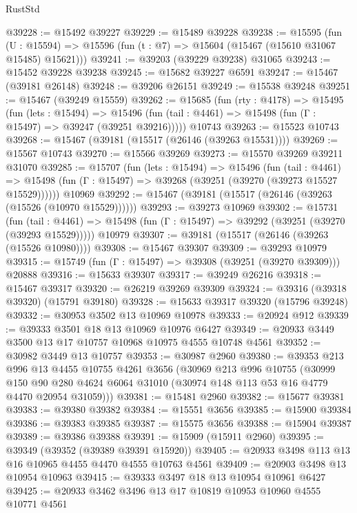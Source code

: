 \begin{lexlean}{RustStd}
\begin{coremodule}
@39228 := @15492 @39227
@39229 := @15489 @39228
@39238 := @15595
    (fun (U : @15594) => @15596 (fun (t : @7) => @15604 (@15467 (@15610 @31067 @15485) @15621)))
@39241 := @39203 (@39229 @39238) @31065
@39243 := @15452 @39228 @39238
@39245 := @15682 @39227 @6591
@39247 := @15467 (@39181 @26148)
@39248 := @39206 @26151
@39249 := @15538 @39248
@39251 := @15467 (@39249 @15559)
@39262 := @15685
    (fun (rty : @4178) =>
    @15495
      (fun (lets : @15494) =>
      @15496 (fun (tail : @4461) => @15498 (fun (Γ : @15497) => @39247 (@39251 @39216)))))
    @10743
@39263 := @15523 @10743
@39268 := @15467 (@39181 (@15517 (@26146 (@39263 @15531))))
@39269 := @15567 @10743
@39270 := @15566 @39269
@39273 := @15570 @39269 @39211 @31070
@39285 := @15707
    (fun (lets : @15494) =>
    @15496
      (fun (tail : @4461) =>
      @15498 (fun (Γ : @15497) => @39268 (@39251 (@39270 (@39273 @15527 @15529))))))
    @10969
@39292 := @15467 (@39181 (@15517 (@26146 (@39263 (@15526 (@10970 @15529))))))
@39293 := @39273 @10969
@39302 := @15731
    (fun (tail : @4461) => @15498 (fun (Γ : @15497) => @39292 (@39251 (@39270 (@39293 @15529)))))
    @10979
@39307 := @39181 (@15517 (@26146 (@39263 (@15526 @10980))))
@39308 := @15467 @39307
@39309 := @39293 @10979
@39315 := @15749 (fun (Γ : @15497) => @39308 (@39251 (@39270 @39309))) @20888
@39316 := @15633 @39307
@39317 := @39249 @26216
@39318 := @15467 @39317
@39320 := @26219 @39269 @39309
@39324 := @39316 (@39318 @39320) (@15791 @39180)
@39328 := @15633 @39317 @39320 (@15796 @39248)
@39332 := @30953 @3502 @13 @10969 @10978
@39333 := @20924 @912
@39339 := @39333 @3501 @18 @13 @10969 @10976 @6427
@39349 := @20933 @3449 @3500 @13 @17 @10757 @10968 @10975 @4555 @10748 @4561
@39352 := @30982 @3449 @13 @10757
@39353 := @30987 @2960
@39380 := @39353
    @213
    @996
    @13
    @4455
    @10755
    @4261
    @3656
    (@30969
      @213
      @996
      @10755
      (@30999
        @150
        @90
        @280
        @4624
        @6064
        @31010
        (@30974 @148 @113 @53 @16 @4779 @4470 @20954 @31059)))
@39381 := @15481 @2960
@39382 := @15677 @39381
@39383 := @39380 @39382
@39384 := @15551 @3656
@39385 := @15900 @39384
@39386 := @39383 @39385
@39387 := @15575 @3656
@39388 := @15904 @39387
@39389 := @39386 @39388
@39391 := @15909 (@15911 @2960)
@39395 := @39349 (@39352 (@39389 @39391 @15920))
@39405 := @20933 @3498 @113 @13 @16 @10965 @4455 @4470 @4555 @10763 @4561
@39409 := @20903 @3498 @13 @10954 @10963
@39415 := @39333 @3497 @18 @13 @10954 @10961 @6427
@39425 := @20933 @3462 @3496 @13 @17 @10819 @10953 @10960 @4555 @10771 @4561

\end{coremodule}
\end{lexlean}
